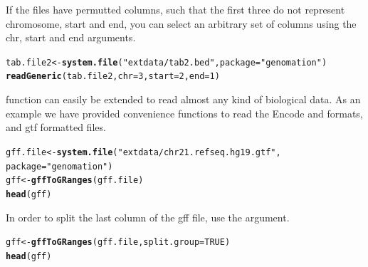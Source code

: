 \documentclass{article}\usepackage[]{graphicx}\usepackage[]{color}
\makeatletter
\newcommand{\hlnum}[1]{\textcolor[rgb]{0.686,0.059,0.569}{#1}}%
\newcommand{\hlstr}[1]{\textcolor[rgb]{0.192,0.494,0.8}{#1}}%
\newcommand{\hlstd}[1]{\textcolor[rgb]{0.345,0.345,0.345}{#1}}%
\newcommand{\hlkwb}[1]{\textcolor[rgb]{0.69,0.353,0.396}{#1}}%
\newcommand{\hlkwc}[1]{\textcolor[rgb]{0.333,0.667,0.333}{#1}}%
\newcommand{\hlkwd}[1]{\textcolor[rgb]{0.737,0.353,0.396}{\textbf{#1}}}%
\newenvironment{kframe}{%
 \def\at@end@of@kframe{}%
 \ifinner\ifhmode%
  \def\at@end@of@kframe{\end{minipage}}%
  \begin{minipage}{\columnwidth}%
 \fi\fi%
 \def\FrameCommand##1{\hskip\@totalleftmargin \hskip-\fboxsep
 \colorbox{shadecolor}{##1}\hskip-\fboxsep
     \hskip-\linewidth \hskip-\@totalleftmargin \hskip\columnwidth}%
 \MakeFramed {\advance\hsize-\width
   \@totalleftmargin\z@ \linewidth\hsize
   \@setminipage}}%
 {\par\unskip\endMakeFramed%
 \at@end@of@kframe}
\newenvironment{knitrout}{}{} %
\makeatother
\begin{document}
If the files have permutted columns, such that the first three do not represent
chromosome, start and end, you can select an arbitrary set of columns using the
chr, start and end arguments.
\begin{knitrout}
\color{fgcolor}\begin{kframe}
\begin{alltt}
\hlstd{tab.file2} \hlkwb{<-} \hlkwd{system.file}\hlstd{(}\hlstr{"extdata/tab2.bed"}\hlstd{,} \hlkwc{package} \hlstd{=} \hlstr{"genomation"}\hlstd{)}
\hlkwd{readGeneric}\hlstd{(tab.file2,} \hlkwc{chr} \hlstd{=} \hlnum{3}\hlstd{,} \hlkwc{start} \hlstd{=} \hlnum{2}\hlstd{,} \hlkwc{end} \hlstd{=} \hlnum{1}\hlstd{)}
\end{alltt}
\end{kframe}
\end{knitrout}


 function can easily be extended to read almost any kind of 
biological data. As an example we have provided convenience functions to read the Encode
 and  formats, and gtf formatted files.
\begin{knitrout}
\color{fgcolor}\begin{kframe}
\begin{alltt}
\hlstd{gff.file} \hlkwb{<-} \hlkwd{system.file}\hlstd{(}\hlstr{"extdata/chr21.refseq.hg19.gtf"}\hlstd{,}
    \hlkwc{package} \hlstd{=} \hlstr{"genomation"}\hlstd{)}
\hlstd{gff} \hlkwb{<-} \hlkwd{gffToGRanges}\hlstd{(gff.file)}
\hlkwd{head}\hlstd{(gff)}
\end{alltt}
\end{kframe}
\end{knitrout}


In order to split the last column of the gff file, use the 
argument.
\begin{knitrout}
\color{fgcolor}\begin{kframe}
\begin{alltt}
\hlstd{gff} \hlkwb{<-} \hlkwd{gffToGRanges}\hlstd{(gff.file,} \hlkwc{split.group} \hlstd{=} \hlnum{TRUE}\hlstd{)}
\hlkwd{head}\hlstd{(gff)}
\end{alltt}
\end{kframe}
\end{knitrout}
\end{document}
